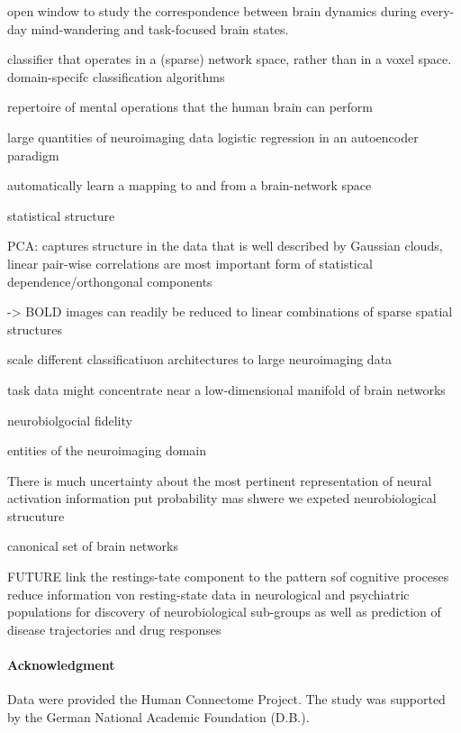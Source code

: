 \documentclass{article} %
\begin{document}
open window to study the correspondence between brain dynamics during
every-day mind-wandering and task-focused brain states.

classifier that operates in a (sparse) network space, rather than in a voxel space.
domain-specifc classification algorithms

repertoire of mental operations that the human brain can perform

large quantities of neuroimaging data
logistic regression in an autoencoder paradigm

automatically learn a mapping to and from a brain-network space

statistical structure

PCA:
captures structure in the data that is well described by Gaussian clouds,
linear pair-wise correlations are most important form of statistical
dependence/orthongonal components

-> BOLD images can readily be reduced to linear combinations of
sparse spatial structures

scale different classificatiuon architectures to large neuroimaging data

task data might concentrate near a low-dimensional manifold of brain networks

neurobiolgocial fidelity

entities of the neuroimaging domain

There is much uncertainty about the most pertinent representation
of neural activation information
put probability mas shwere we expeted neurobiological strucuture

canonical set of brain networks


FUTURE
link the restings-tate component to the pattern sof cognitive proceses
reduce information von resting-state data in neurological and psychiatric
populations for discovery of neurobiological sub-groups as well as
prediction of disease trajectories and drug responses


%
\paragraph{Acknowledgment}
{\small
Data were provided the Human Connectome Project. The study was supported
by the German National Academic Foundation (D.B.).
}


\small


\end{document}
